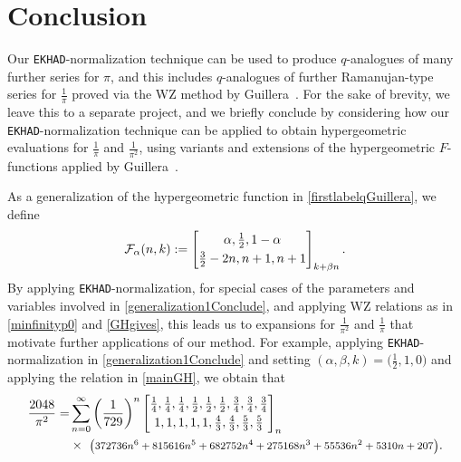 \documentclass[12pt]{article}
\begin{document}
\section{Conclusion}\label{sectionConclusion}
 Our {\tt EKHAD}-normalization technique can be used to produce $q$-analogues of many further series for $\pi$, and this includes 
 $q$-analogues of further Ramanujan-type series for $\frac{1}{\pi}$ proved via the WZ method by Guillera~\cite{Guillera2006}. For the 
 sake of brevity, we leave this to a separate project, and we briefly conclude by considering how our {\tt EKHAD}-normalization 
 technique can be applied to obtain hypergeometric evaluations for $\frac{1}{\pi}$ and $\frac{1}{\pi^2}$, using variants and 
 extensions of the hypergeometric $F$-functions applied by Guillera~\cite{Guillera2002}. 

 As a generalization of the hypergeometric function in \eqref{firstlabelqGuillera}, we define
\begin{equation}\label{generalization1Conclude}
 \mathcal{F}_{\alpha}(n, k) := \left[ \begin{matrix} 
 \alpha, \frac{1}{2}, 1 - \alpha
 \vspace{1mm} \\ 
 \frac{3}{2} - 2 n, n + 1, n + 1 
 \end{matrix} \right]_{k + \beta n}. 
\end{equation}
 By applying {\tt EKHAD}-normalization, 
 for special cases of the parameters and variables involved in 
 \eqref{generalization1Conclude}, and applying WZ relations as in \eqref{minfinityp0} and 
 \eqref{GHgives}, this leads us to expansions for $\frac{1}{\pi^2}$
 and $\frac{1}{\pi}$ that motivate further applications of our method. 
 For example, 
 applying {\tt EKHAD}-normalization 
 in \eqref{generalization1Conclude} 
 and setting 
 $(\alpha, \beta, k) = \big( \frac{1}{2}, 1, 0 \big)$ 
 and applying the relation in \eqref{mainGH}, 
 we obtain that 
\begin{align*}
 \frac{2048}{\pi ^2} 
 = & \sum_{n = 
 0}^{\infty} 
 \left( \frac{1}{729} \right)^{n} 
 \left[ \begin{matrix} 
 \frac{1}{4}, \frac{1}{4}, \frac{1}{4}, \frac{1}{2}, \frac{1}{2}, \frac{1}{2}, \frac{3}{4}, \frac{3}{4}, \frac{3}{4} 
 \vspace{1mm} \\ 
 1, 1, 1, 1, 1, \frac{4}{3}, \frac{4}{3}, \frac{5}{3}, \frac{5}{3} 
 \end{matrix} \right]_{n} \\
 & 
 \times \text{ \footnotesize{$ \big( 372736 n^6+815616 n^5+682752 n^4+275168 n^3+55536 n^2+5310 n+207 \big)$}}. 
\end{align*}
\end{document}
